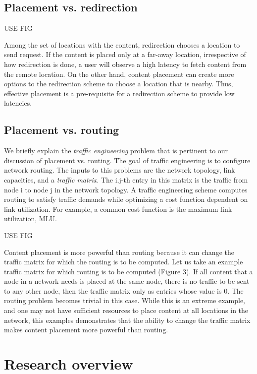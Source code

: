 \subsection{Placement vs. redirection}

USE FIG

Among the set of locations with the content, redirection chooses a location to send request. If the content is placed only at a far-away location, irrespective of how redirection is done, a user will observe a high latency to fetch content from the remote location. On the other hand, content placement can create more options to the redirection scheme to choose a location that is nearby. Thus, effective placement is a pre-requisite for a redirection scheme to provide low latencies.


\subsection{Placement vs. routing}

We briefly explain the \emph{traffic engineering} problem that is pertinent to our discussion of placement vs. routing. 
The goal of traffic engineering is to configure network routing. 
The inputs to this problems are the network topology, link capacities, and a \emph{traffic matrix}. 
The i,j-th entry in this matrix is the traffic from node i to node j in the network topology.
A traffic engineering scheme computes routing to satisfy traffic demands while optimizing a cost function dependent on link utilization. For example, a common cost function is the maximum link utilization, MLU. 

USE FIG

Content placement is more powerful than routing because it can change the traffic matrix for which the routing is to be computed. Let us take an example traffic matrix for which routing is to be computed (Figure 3). If all content that a node in a network needs is placed at the same node, there is no traffic to be sent to any other node, then the traffic matrix only as entries whose value is 0. The routing problem becomes trivial in this case. While this is an extreme example, and one may not have sufficient resources to place content at all locations in the network, this examples demonstrates that the ability to change the traffic matrix makes content placement more powerful than routing.

\section{Research overview}

